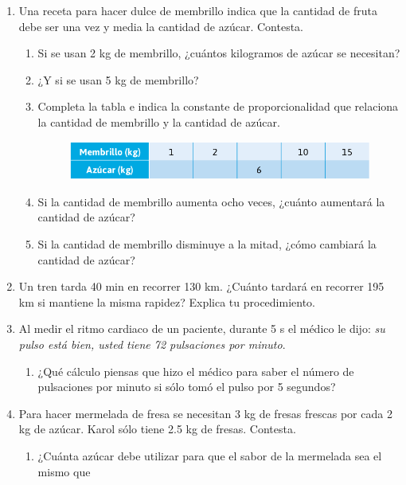 \documentclass[11pt]{book}
\begin{document}
\begin{enumerate}
  \item Una receta para hacer dulce de membrillo indica que la cantidad de fruta debe
        ser una vez y media la cantidad de azúcar. Contesta.
        \begin{enumerate}
          \item Si se usan 2 kg de membrillo, ¿cuántos kilogramos de azúcar se necesitan?
          \item ¿Y si se usan 5 kg de membrillo?
          \item Completa la tabla e indica la constante de proporcionalidad que relaciona la cantidad
                de membrillo y la cantidad de azúcar.
                \begin{figure}[H]
                  \centering
                  \includegraphics[width=0.6\linewidth]{tabla_azucar.png}
                  \label{tab:tabla_azucar}
                \end{figure}
          \item Si la cantidad de membrillo aumenta ocho veces, ¿cuánto aumentará la cantidad
                de azúcar?
          \item Si la cantidad de membrillo disminuye a la mitad, ¿cómo cambiará la cantidad de
                azúcar?
        \end{enumerate}
  \item Un tren tarda 40 min en recorrer 130 km. ¿Cuánto tardará en recorrer 195 km si
        mantiene la misma rapidez? Explica tu procedimiento.
  \item Al medir el ritmo cardiaco de un paciente, durante 5 s el médico le dijo: \emph{su
          pulso está bien, usted tiene 72 pulsaciones por minuto}.
        \begin{enumerate}
          \item ¿Qué cálculo piensas que hizo el médico para saber el número de pulsaciones
                por minuto si sólo tomó el pulso por 5 segundos?
        \end{enumerate}
  \item Para hacer mermelada de fresa se necesitan 3 kg de fresas frescas por cada 2 kg
        de azúcar. Karol sólo tiene 2.5 kg de fresas. Contesta.
        \begin{enumerate}
          \item ¿Cuánta azúcar debe utilizar para que el sabor de la mermelada sea el mismo que

\end{enumerate}
\end{enumerate}
\end{document}
